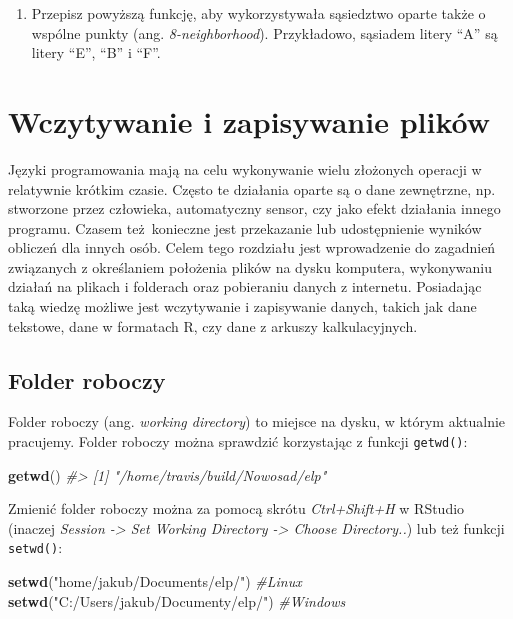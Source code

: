 \documentclass[paper=6in:9in,pagesize=pdftex,headinclude=on,footinclude=on,10pt]{scrbook}
\newenvironment{Shaded}{\begin{snugshade}}{\end{snugshade}}
\newcommand{\CommentTok}[1]{\textcolor[rgb]{0.56,0.35,0.01}{\textit{#1}}}
\newcommand{\KeywordTok}[1]{\textcolor[rgb]{0.13,0.29,0.53}{\textbf{#1}}}
\newcommand{\NormalTok}[1]{#1}
\newcommand{\StringTok}[1]{\textcolor[rgb]{0.31,0.60,0.02}{#1}}
\providecommand{\tightlist}{%
  \setlength{\itemsep}{0pt}\setlength{\parskip}{0pt}}
\begin{document}
\begin{enumerate}
\def\labelenumi{\arabic{enumi})}
\setcounter{enumi}{11}
\tightlist
\item
  Przepisz powyższą funkcję, aby wykorzystywała sąsiedztwo oparte także o wspólne punkty (ang. \emph{8-neighborhood}).
  Przykładowo, sąsiadem litery ``A'' są litery ``E'', ``B'' i ``F''.
\end{enumerate}

\hypertarget{io}{%
\chapter{Wczytywanie i zapisywanie plików}\label{io}}

Języki programowania mają na celu wykonywanie wielu złożonych operacji w relatywnie krótkim czasie.
Często te działania oparte są o dane zewnętrzne, np. stworzone przez człowieka, automatyczny sensor, czy jako efekt działania innego programu.
Czasem też~konieczne jest przekazanie lub udostępnienie wyników obliczeń dla innych osób.
Celem tego rozdziału jest wprowadzenie do zagadnień związanych z określaniem położenia plików na dysku komputera, wykonywaniu działań na plikach i folderach oraz pobieraniu danych z internetu.
Posiadając taką wiedzę możliwe jest wczytywanie i zapisywanie danych, takich jak dane tekstowe, dane w formatach R, czy dane z arkuszy kalkulacyjnych.

\hypertarget{folder-roboczy}{%
\section{Folder roboczy}\label{folder-roboczy}}

Folder roboczy (ang. \emph{working directory}) to miejsce na dysku, w którym aktualnie pracujemy.
Folder roboczy można sprawdzić korzystając z funkcji \texttt{getwd()}:

\begin{Shaded}
\begin{Highlighting}[]
\KeywordTok{getwd}\NormalTok{()}
\CommentTok{#> [1] "/home/travis/build/Nowosad/elp"}
\end{Highlighting}
\end{Shaded}

Zmienić folder roboczy można za pomocą skrótu \emph{Ctrl+Shift+H} w RStudio (inaczej \emph{Session -\textgreater{} Set Working Directory -\textgreater{} Choose Directory..}) lub też funkcji \texttt{setwd()}:

\begin{Shaded}
\begin{Highlighting}[]
\KeywordTok{setwd}\NormalTok{(}\StringTok{"home/jakub/Documents/elp/"}\NormalTok{) }\CommentTok{#Linux}
\KeywordTok{setwd}\NormalTok{(}\StringTok{"C:/Users/jakub/Documenty/elp/"}\NormalTok{) }\CommentTok{#Windows}
\end{Highlighting}
\end{Shaded}
\end{document}
